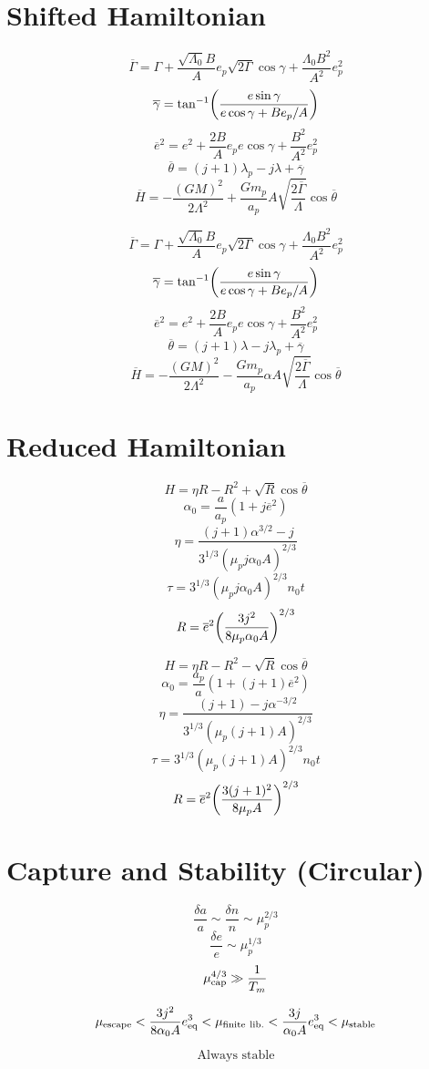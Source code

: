 \documentclass[12pt]{extarticle}
\renewcommand{\bar}[1]{\overline{ #1 }}
\DeclarePairedDelimiter{\p}{(}{)}
\begin{document}
  \section*{Shifted Hamiltonian}
\begin{minipage}[t]{0.5\linewidth}
  \[ \overline{\Gamma} = \Gamma + \frac{\sqrt{\Lambda_0}B}{A} e_p\sqrt{2\Gamma}\cos\gamma + \frac{\Lambda_0B^2}{A^2}e_p^2 \]
\[ \overline{\gamma} = \tan^{-1}\p*{\frac{e\sin\gamma}{e\cos\gamma + Be_p/A}} \]
\[ \overline{e}^2 = e^2 + \frac{2B}{A} e_p e \cos\gamma + \frac{B^2}{A^2}e_p^2\]
  \[\overline{\theta} = (j+1)\lambda_p - j\lambda + \overline{\gamma} \]
\[ \overline{H} = - \frac{(GM)^2}{2\Lambda^2} + \frac{Gm_p}{a_p}A\sqrt{\frac{2\overline{\Gamma}}{\Lambda}}\cos\overline{\theta} \]
\end{minipage}
\begin{minipage}[t]{0.5\linewidth}
  \[ \overline{\Gamma} = \Gamma + \frac{\sqrt{\Lambda_0}B}{A} e_p\sqrt{2\Gamma}\cos\gamma + \frac{\Lambda_0B^2}{A^2}e_p^2 \]
\[ \overline{\gamma} = \tan^{-1}\p*{\frac{e\sin\gamma}{e\cos\gamma + Be_p/A}} \]
\[ \overline{e}^2 = e^2 + \frac{2B}{A} e_p e \cos\gamma + \frac{B^2}{A^2}e_p^2\]
  \[\overline{\theta} = (j+1)\lambda - j\lambda_p + \overline{\gamma} \]
\[ \overline{H} = - \frac{(GM)^2}{2\Lambda^2} - \frac{Gm_p}{a_p}\alpha A\sqrt{\frac{2\overline{\Gamma}}{\Lambda}}\cos\overline{\theta} \]
\end{minipage}
  \section*{Reduced Hamiltonian}
\begin{minipage}[t]{0.5\linewidth}
  \[ H = \eta R - R^2 + \sqrt{R}\cos\bar{\theta} \]
  \[ \alpha_0 = \frac{a}{a_p}(1+j\overline{e}^2) \]
  \[ \eta = \frac{(j+1)\alpha^{3/2} - j}{3^{1/3}(\mu_p j \alpha_0 A)^{2/3}} \]
  \[ \tau = 3^{1/3}(\mu_p j \alpha_0 A)^{2/3} n_0 t\]
  \[ R = \overline{e}^2 \p*{\frac{3j^2}{8\mu_p \alpha_0 A}}^{2/3} \]
\end{minipage}
\begin{minipage}[t]{0.5\linewidth}
  \[ H = \eta R - R^2 - \sqrt{R}\cos\bar{\theta} \]
  \[ \alpha_0 = \frac{a_p}{a}(1+(j+1)\overline{e}^2) \]
  \[ \eta = \frac{(j+1) - j\alpha^{-3/2}}{3^{1/3}(\mu_p (j+1) A)^{2/3}} \]
  \[ \tau = 3^{1/3}(\mu_p (j+1) A)^{2/3} n_0 t\]
  \[ R = \overline{e}^2 \p*{\frac{3(j+1)^2}{8\mu_p A}}^{2/3} \]
\end{minipage}

\newpage
  \section*{Capture and Stability (Circular)}
  \[ \frac{\delta a}{a} \sim \frac{\delta n}{n} \sim \mu_p^{2/3}\]
  \[ \frac{\delta e}{e}\sim \mu_p^{1/3}\]
  \[\mu_{\rm cap}^{4/3}\gg \frac{1}{T_m}\]
\begin{minipage}[t]{0.5\linewidth}
  \[\mu_{\rm escape} <
    \frac{3j^2}{8\alpha_0A}e_{\rm eq}^3
    < \mu_{\rm finite~lib.} <
    \frac{3j}{\alpha_0A}e_{\rm eq}^3
    < \mu_{\rm stable} \]
\end{minipage}
\begin{minipage}[t]{0.5\linewidth}
  \[\text{Always stable}\]
\end{minipage}
\end{document}

